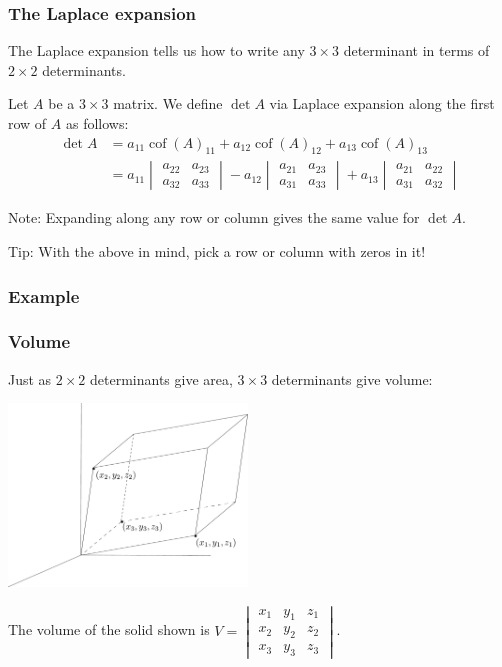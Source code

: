 \documentclass[11pt,t]{beamer}
\DeclareMathOperator{\cof}{cof}
\begin{document}
\begin{frame}
\frametitle{The Laplace expansion}
The \alert{Laplace expansion} tells us how to write any $3\times 3$ determinant in terms of $2\times 2$ determinants.
\begin{definition}
Let $A$ be a $3\times 3$ matrix. We define $\det A$ via Laplace expansion along the first row of $A$ as follows:
\begin{align*}
\det A &= a_{11}\cof(A)_{11}+a_{12}\cof(A)_{12}+a_{13}\cof(A)_{13}\\
& = a_{11}\begin{vmatrix}
a_{22}&a_{23}\\a_{32}&a_{33}
\end{vmatrix}-a_{12}\begin{vmatrix}
a_{21}&a_{23}\\a_{31}&a_{33}
\end{vmatrix}+a_{13}\begin{vmatrix}
a_{21}&a_{22}\\a_{31}&a_{32}
\end{vmatrix}
\end{align*}
\end{definition}
\alert{Note:} Expanding along \alert{any row or column} gives the same value for $\det A$.

\bigskip

\alert{Tip:} With the above in mind, pick a row or column with zeros in it!
\end{frame}
\begin{frame}
\frametitle{Example}

\end{frame}
\begin{frame}
\frametitle{Volume}
Just as $2\times 2$ determinants give area, $3\times 3$ determinants give volume:
\begin{center}
\includegraphics[width=2.5in]{Parallelepiped.pdf}
\end{center}
The volume of the solid shown is $V=\begin{vmatrix}
x_1&y_1&z_1\\x_2&y_2&z_2\\x_3&y_3&z_3
\end{vmatrix}$.

\end{frame}
\end{document}
